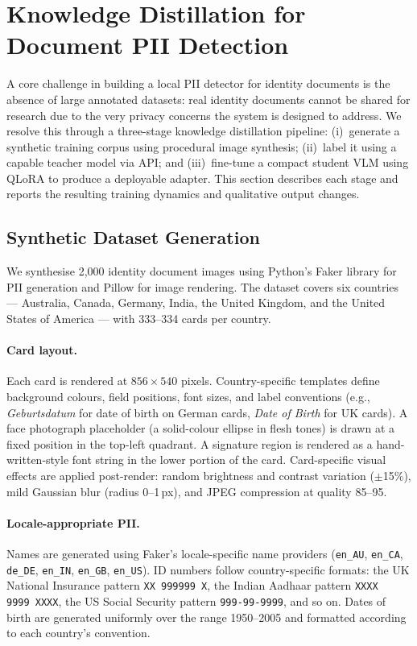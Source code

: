 \section{Knowledge Distillation for Document PII Detection}
\label{sec:knowledge_distillation}

A core challenge in building a local PII detector for
identity documents is the absence of large annotated
datasets: real identity documents cannot be shared for
research due to the very privacy concerns the system
is designed to address.
We resolve this through a three-stage knowledge
distillation pipeline:
(i)~generate a synthetic training corpus using
procedural image synthesis;
(ii)~label it using a capable teacher model via API;
and (iii)~fine-tune a compact student VLM using
QLoRA to produce a deployable adapter.
This section describes each stage and reports the
resulting training dynamics and qualitative output
changes.

\subsection{Synthetic Dataset Generation}

We synthesise 2,000 identity document images using
Python's Faker library for PII generation and Pillow
for image rendering.
The dataset covers six countries --- Australia,
Canada, Germany, India, the United Kingdom, and the
United States of America --- with 333--334 cards per
country.

\paragraph{Card layout.}
Each card is rendered at $856 \times 540$ pixels.
Country-specific templates define background colours,
field positions, font sizes, and label conventions
(e.g., \textit{Geburtsdatum} for date of birth on
German cards, \textit{Date of Birth} for UK cards).
A face photograph placeholder (a solid-colour ellipse
in flesh tones) is drawn at a fixed position in the
top-left quadrant.
A signature region is rendered as a hand-written-style
font string in the lower portion of the card.
Card-specific visual effects are applied post-render:
random brightness and contrast variation
($\pm$15\%), mild Gaussian blur (radius 0--1\,px),
and JPEG compression at quality 85--95.

\paragraph{Locale-appropriate PII.}
Names are generated using Faker's locale-specific
name providers
(\texttt{en\_AU}, \texttt{en\_CA}, \texttt{de\_DE},
\texttt{en\_IN}, \texttt{en\_GB}, \texttt{en\_US}).
ID numbers follow country-specific formats: the UK
National Insurance pattern \texttt{XX\,999999\,X},
the Indian Aadhaar pattern \texttt{XXXX\,9999\,XXXX},
the US Social Security pattern \texttt{999-99-9999},
and so on.
Dates of birth are generated uniformly over the range
1950--2005 and formatted according to each country's
convention.

